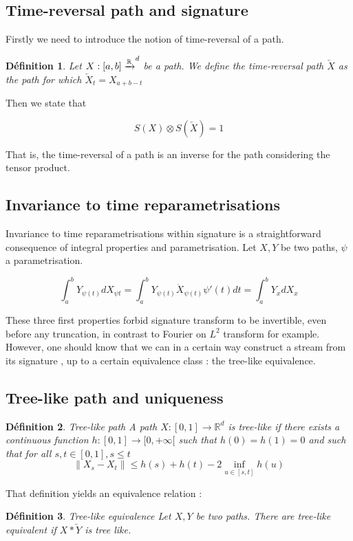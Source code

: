 \documentclass[10pt,a4paper]{article}
\newtheorem{definition}{Définition}
\begin{document}
\subsection{Time-reversal path and signature}
Firstly we need to introduce the notion of time-reversal of a path.
\begin{definition}
Let $X : [a,b] \xrightarrow {\mathbb{R}}^d$ be a path. We define the time-reversal path $\overleftarrow{X}$ as the path for which $\overleftarrow{X}_t = X_{a+b-t}$
\end{definition}

Then we state that
\begin{theorem}
$$S(X) \otimes S(\overleftarrow{X}) = 1$$
\end{theorem}

That is, the time-reversal of a path is an inverse for the path considering the tensor product.

\subsection{Invariance to time reparametrisations}
Invariance to time reparametrisations within signature is a straightforward consequence of integral properties and parametrisation. Let $X, Y$ be two paths, $\psi$ a parametrisation. 

$$\int_a ^b Y_{\psi(t)} dX_{\psi{t}} = \int_a ^b Y_{\psi(t)} \dot{X}_{\psi(t)} \psi'(t) dt = \int_a ^b Y_x dX_x$$


These three first properties forbid signature transform to be invertible, even before any truncation, in contrast to Fourier on $L^2$ transform for example. However, one should know that we can in a certain way construct a stream from its signature \cite{Geng_2017}, up to a certain equivalence class : the tree-like equivalence.
\subsection{Tree-like path and uniqueness }
\begin{definition}{Tree-like path}
A path $X : [0, 1] \rightarrow \mathbb{R}^d$ is tree-like if there exists a continuous function $h : [0,1] \rightarrow [0, +\infty[$ such that $h(0) = h(1) = 0$ and such that for all $s,t \in [0,1], s\leq t$
$$\| X_s - X_t \| \leq h(s) + h(t) - 2 \inf_{u\in [s, t]} h(u)$$


\end{definition}
That definition yields an equivalence relation \cite{uniqueness}: 
\begin{definition}{Tree-like equivalence}
Let $X, Y$  be two paths. There are tree-like equivalent if $X * \overleftarrow{Y}$ is tree like.
\end{definition}
\end{document}

